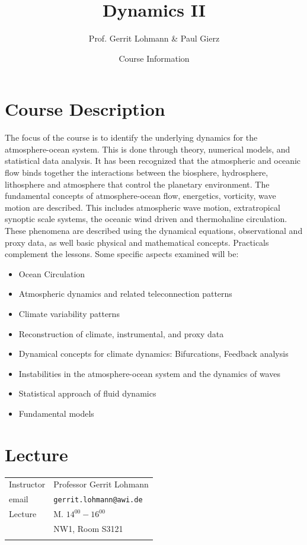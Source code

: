 \documentclass[11pt]{article}
\title{Dynamics II}
\author{Prof. Gerrit Lohmann \& Paul Gierz}
\date{Course Information}
\begin{document}
\maketitle

\section*{Course Description}

The focus of the course is to identify the underlying dynamics for the atmosphere-ocean system. This is done through theory, numerical models, and statistical data analysis. It has been recognized that the atmospheric and oceanic flow binds together the interactions between the biosphere, hydrosphere, lithosphere and atmosphere that control the planetary environment. The fundamental concepts of atmosphere-ocean flow, energetics, vorticity, wave motion are described. This includes atmospheric wave motion, extratropical synoptic scale systems, the oceanic wind driven and thermohaline circulation. These phenomena are described using the dynamical equations, observational and proxy data, as well basic physical and mathematical concepts. Practicals complement the lessons. Some specific aspects examined will be:
\begin{itemize}
\item Ocean Circulation
\item Atmospheric dynamics and related teleconnection patterns
\item Climate variability patterns
\item Reconstruction of climate, instrumental, and proxy data
\item Dynamical concepts for climate dynamics: Bifurcations, Feedback analysis
\item Instabilities in the atmosphere-ocean system and the dynamics of waves
\item Statistical approach of fluid dynamics
\item Fundamental models
\end{itemize}

\section*{Lecture}
\begin{tabular}{>{\hfill}p{5cm}|p{11cm}} 
	Instructor & Professor Gerrit Lohmann \\
	email & \texttt{gerrit.lohmann@awi.de} \\
	Lecture & M. $14^{00}-16^{00}$ \\
	&  NW1, Room S3121 \\
	\multicolumn{2}{c}{} 
\end{tabular}
\end{document}
